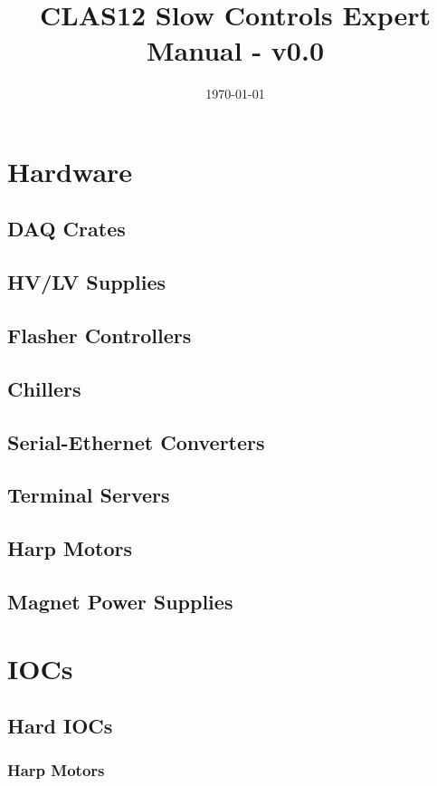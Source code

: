 \documentclass[amsmath,amssymb,notitlepage,11pt]{revtex4}
\begin{document}
\title{CLAS12 Slow Controls Expert Manual - v0.0}
\date{\today}
\begin{abstract}
\end{abstract}

\maketitle
\tableofcontents
\newpage

\section{Hardware}
\subsection{DAQ Crates}
\subsection{HV/LV Supplies}
\subsection{Flasher Controllers}
\subsection{Chillers}
\subsection{Serial-Ethernet Converters}
\subsection{Terminal Servers}
\subsection{Harp Motors}
\subsection{Magnet Power Supplies}

\section{IOCs}
\subsection{Hard IOCs}
\subsubsection{Harp Motors}
\end{document}
